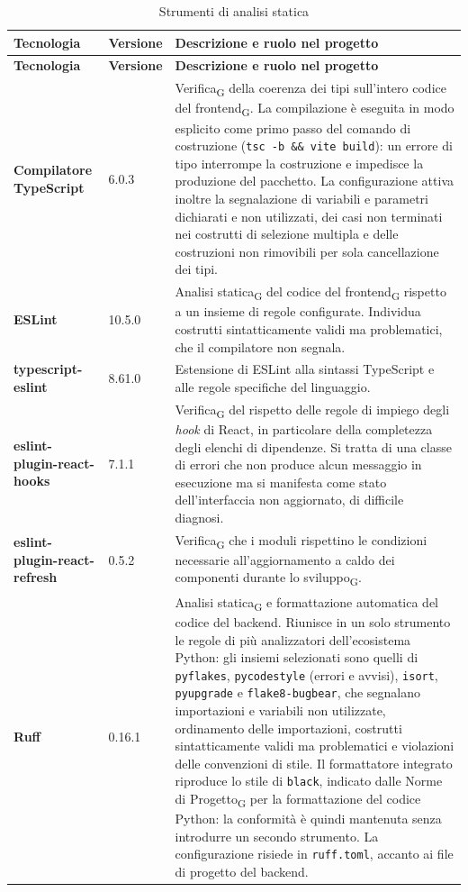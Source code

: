 \documentclass[a4paper, 10pt]{article}
\newcommand{\vTS}{6.0.3}        %
\newcommand{\vRuff}{0.16.1}
\newenvironment{tabellatec}[2]{%
  \begingroup
  \small
  \setlength{\tabcolsep}{4pt}
  \begin{longtable}{|p{2.8cm}|p{1.5cm}|p{9.2cm}|}
    \caption{#1}\label{#2}\\
    \hline
    \textbf{Tecnologia} & \textbf{Versione} & \textbf{Descrizione e ruolo nel progetto} \\
    \hline
    \endfirsthead
    \hline
    \textbf{Tecnologia} & \textbf{Versione} & \textbf{Descrizione e ruolo nel progetto} \\
    \hline
    \endhead
}{%
  \end{longtable}
  \endgroup
}
\begin{document}
\begin{tabellatec}{Strumenti di analisi statica}{tab:tec-statica}
    \textbf{Compilatore TypeScript} & \vTS & Verifica\textsubscript{G} della coerenza dei tipi sull'intero codice del frontend\textsubscript{G}. La compilazione è eseguita in modo esplicito come primo passo del comando di costruzione (\texttt{tsc -b \&\& vite build}): un errore di tipo interrompe la costruzione e impedisce la produzione del pacchetto. La configurazione attiva inoltre la segnalazione di variabili e parametri dichiarati e non utilizzati, dei casi non terminati nei costrutti di selezione multipla e delle costruzioni non rimovibili per sola cancellazione dei tipi. \\ \hline

    \textbf{ESLint} & 10.5.0 & Analisi statica\textsubscript{G} del codice del frontend\textsubscript{G} rispetto a un insieme di regole configurate. Individua costrutti sintatticamente validi ma problematici, che il compilatore non segnala. \\ \hline

    \textbf{typescript-eslint} & 8.61.0 & Estensione di ESLint alla sintassi TypeScript e alle regole specifiche del linguaggio. \\ \hline

    \textbf{eslint-plugin-\newline react-hooks} & 7.1.1 & Verifica\textsubscript{G} del rispetto delle regole di impiego degli \textit{hook} di React, in particolare della completezza degli elenchi di dipendenze. Si tratta di una classe di errori che non produce alcun messaggio in esecuzione ma si manifesta come stato dell'interfaccia non aggiornato, di difficile diagnosi. \\ \hline

    \textbf{eslint-plugin-\newline react-refresh} & 0.5.2 & Verifica\textsubscript{G} che i moduli rispettino le condizioni necessarie all'aggiornamento a caldo dei componenti durante lo sviluppo\textsubscript{G}. \\ \hline

    \textbf{Ruff} & \vRuff & Analisi statica\textsubscript{G} e formattazione automatica del codice del backend. Riunisce in un solo strumento le regole di più analizzatori dell'ecosistema Python: gli insiemi selezionati sono quelli di \texttt{pyflakes}, \texttt{pycodestyle} (errori e avvisi), \texttt{isort}, \texttt{pyupgrade} e \texttt{flake8-bugbear}, che segnalano importazioni e variabili non utilizzate, ordinamento delle importazioni, costrutti sintatticamente validi ma problematici e violazioni delle convenzioni di stile. Il formattatore integrato riproduce lo stile di \texttt{black}, indicato dalle Norme di Progetto\textsubscript{G} per la formattazione del codice Python: la conformità è quindi mantenuta senza introdurre un secondo strumento. La configurazione risiede in \texttt{ruff.toml}, accanto ai file di progetto del backend. \\ \hline


\end{tabellatec}
\end{document}

